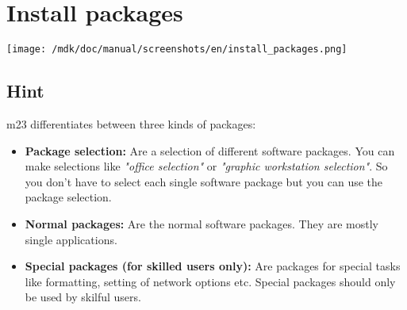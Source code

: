 \section{Install packages}
\texttt{[image: /mdk/doc/manual/screenshots/en/install\_packages.png]} \\
\subsection{Hint}
m23 differentiates between three kinds of packages:\\
\begin{itemize}
\item \textbf{Package selection:} Are a selection of different software packages. You can make selections like \textit{"office selection"} or \textit{"graphic workstation selection"}. So you don't have to select each single software package but you can use the package selection.\\
\item \textbf{Normal packages:} Are the normal software packages. They are mostly single applications.\\
\item \textbf{Special packages (for skilled users only):} Are packages for special tasks like formatting, setting of network options etc. Special packages should only be used by skilful users.\\
\end{itemize}
